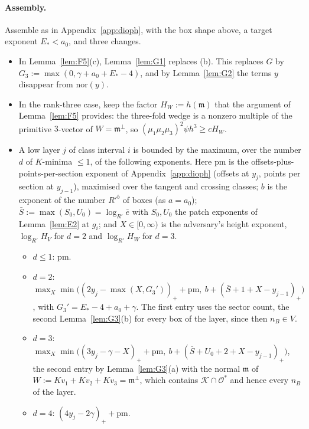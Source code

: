 \documentclass[aps,prx,twocolumn,superscriptaddress,nofootinbib,longbibliography]{revtex4-2}
\theoremstyle{plain}
\theoremstyle{definition}
\theoremstyle{remark}
\begin{document}
\paragraph{Assembly.} Assemble as in Appendix~\ref{app:dioph}, with the box shape above, a target exponent $E_*<a_0$, and three changes.
\begin{itemize}\setlength\itemsep{0pt}
\item In Lemma~\ref{lem:F5}(c), Lemma~\ref{lem:G1} replaces (b). This replaces $G$ by
$G_3:=\max(0,\gamma+a_0+E_*-4)$, and by Lemma~\ref{lem:G2} the terms $y$ disappear from $\mathrm{nor}(y)$.
\item In the rank-three case, keep the factor $H_W:=h(\mathfrak m)$ that the argument of
Lemma~\ref{lem:F5} provides: the three-fold wedge is a nonzero multiple of the primitive $3$-vector of
$W=\mathfrak m^\perp$, so $(\mu_1\mu_2\mu_3)^2\psi h^3\ge cH_W$.
\item A low layer $j$ of class interval $i$ is bounded by the maximum, over the number $d$ of $K$-minima
$\le1$, of the following exponents. Here $\mathrm{pm}$ is the offsets-plus-points-per-section exponent of
Appendix~\ref{app:dioph} (offsets at $y_j$, points per section at $y_{j-1}$), maximised over the tangent and crossing classes; $b$ is the exponent of the number $R'^b$ of boxes (as $a=a_0$); $\bar S:=\max(S_0,U_0)=\log_{R'}\bar e$ with $S_0,U_0$ the patch exponents of Lemma~\ref{lem:E2} at $g_i$; and $X\in[0,\infty)$ is the adversary's height exponent, $\log_{R'}H_V$ for $d=2$ and $\log_{R'}H_W$ for $d=3$.
\begin{itemize}\setlength\itemsep{0pt}
\item $d\le1$: $\mathrm{pm}$.
\item $d=2$: $\max_X\min\big((2y_j-\max(X,G_3'))_++\mathrm{pm},\ b+(\bar S+1+X-y_{j-1})_+\big)$, with
$G_3'=E_*-4+a_0+\gamma$. The first entry uses the sector count, the second Lemma~\ref{lem:G3}(b) for every
box of the layer, since then $n_B\in V$.
\item $d=3$: $\max_X\min\big((3y_j-\gamma-X)_++\mathrm{pm},\ b+(\bar S+U_0+2+X-y_{j-1})_+\big)$, the
second entry by Lemma~\ref{lem:G3}(a) with the normal $\mathfrak m$ of $W:=Kv_1+Kv_2+Kv_3=\mathfrak m^\perp$, which contains $\mathcal K\cap\mathcal O^*$ and hence every $n_B$ of the layer.
\item $d=4$: $(4y_j-2\gamma)_++\mathrm{pm}$.
\end{itemize}
\end{itemize}
\end{document}
